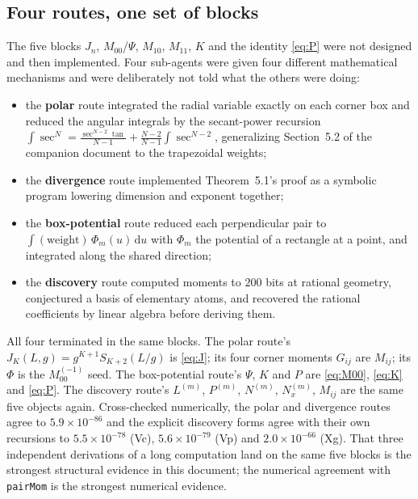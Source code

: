 \documentclass[11pt]{article}
\theoremstyle{remark}
\newcommand{\dd}{\mathrm{d}}
\newcommand{\code}[1]{\texttt{#1}}
\begin{document}
\subsection{Four routes, one set of blocks}
\label{sec:conv}

The five blocks $J_n$, $M_{00}$/$\Psi$, $M_{10}$, $M_{11}$, $K$ and the identity
\eqref{eq:P} were not designed and then implemented. Four sub-agents were given four
different mathematical mechanisms and were deliberately not told what the others were
doing:

\begin{itemize}[nosep]
\item the \textbf{polar} route integrated the radial variable exactly on each corner box
and reduced the angular integrals by the secant-power recursion
$\int\sec^N = \frac{\sec^{N-2}\tan}{N-1} + \frac{N-2}{N-1}\int\sec^{N-2}$, generalizing
Section~5.2 of the companion document to the trapezoidal weights;
\item the \textbf{divergence} route implemented Theorem~5.1's proof as a symbolic program
lowering dimension and exponent together;
\item the \textbf{box-potential} route reduced each perpendicular pair to
$\int(\text{weight})\,\Phi_m(u)\,\dd u$ with $\Phi_m$ the potential of a rectangle at a
point, and integrated along the shared direction;
\item the \textbf{discovery} route computed moments to $200$ bits at rational geometry,
conjectured a basis of elementary atoms, and recovered the rational coefficients by linear
algebra before deriving them.
\end{itemize}

All four terminated in the same blocks. The polar route's
$J_K(L,g) = g^{K+1}S_{K+2}(L/g)$ is \eqref{eq:J}; its four corner moments $G_{ij}$ are
$M_{ij}$; its $\Phi$ is the $M_{00}^{(-1)}$ seed. The box-potential route's $\Psi$, $K$
and $P$ are \eqref{eq:M00}, \eqref{eq:K} and \eqref{eq:P}. The discovery route's
$L^{(m)}$, $P^{(m)}$, $N^{(m)}$, $N_x^{(m)}$, $M_{ij}$ are the same five objects again.
Cross-checked numerically, the polar and divergence routes agree to $5.9\times10^{-86}$
and the explicit discovery forms agree with their own recursions to $5.5\times10^{-78}$
(Vc), $5.6\times10^{-79}$ (Vp) and $2.0\times10^{-66}$ (Xg). That three independent
derivations of a long computation land on the same five blocks is the strongest structural
evidence in this document; the numerical agreement with \code{pairMom} is the strongest
numerical evidence.
\end{document}
